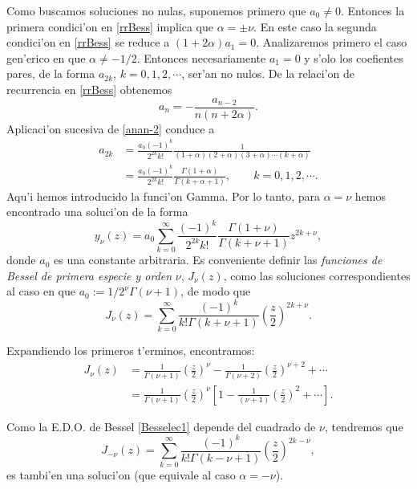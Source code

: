 Como buscamos soluciones no nulas, suponemos primero que $a_0\neq 0$. Entonces la primera condici'on en \eqref{rrBess} implica que $\alpha=\pm\nu$. En este caso la segunda condici'on en \eqref{rrBess} se reduce a $(1+2\alpha)a_1=0$. Analizaremos primero el caso gen'erico en que $\alpha\neq -1/2$. Entonces necesariamente $a_1=0$ y s'olo los coefientes pares, de la forma $a_{2k}$, $k=0,1,2,\cdots$, ser'an no nulos. De la relaci'on de recurrencia en \eqref{rrBess} obtenemos
\begin{equation}\label{anan-2}
a_n=-\frac{a_{n-2}}{n(n+2\alpha)}.
\end{equation}
Aplicaci'on sucesiva de \eqref{anan-2} conduce a
\begin{align}
a_{2 k} &= \frac{a_0(-1)^k}{2^{2k}k!}\frac{1}{(1+\alpha)(2+\alpha)(3+\alpha)\cdots (k+\alpha)}\\
&= \frac{a_0 (-1)^k}{2^{2k} k!}\frac{\Gamma(1+\alpha)}{\Gamma(k +\alpha+ 1) }, \qquad k=0,1,2,\cdots. 
\end{align}
Aqu'i hemos introducido la funci'on Gamma. Por lo tanto, para $\alpha=\nu$ hemos encontrado una soluci'on de la forma
\begin{equation}
y_\nu(z) = a_0 \sum_{k=0}^\infty \frac{(-1)^k}{2^{2k}k!}\frac{\Gamma(1+\nu)}{\Gamma(k+\nu+ 1) }
z^{2k+\nu},
\end{equation}
donde $a_0$ es una constante arbitraria. Es conveniente definir las \textit{funciones de Bessel de primera especie y orden} $\nu$, $J_\nu(z)$, como las soluciones correspondientes al caso en que $a_0:=1/2^{\nu}\Gamma(\nu+1)$, de modo que
\begin{equation}\label{Besselnu}
\boxed{J_\nu(z) = \sum_{k = 0}^\infty \frac{ (-1)^k }{ k! \Gamma(k + \nu + 1) }
\left( \frac{z}{2} \right)^{2k+\nu}.}
\end{equation}

Expandiendo los primeros t'erminos, encontramos:
\begin{align}\label{J-nu}
J_\nu(z) &= \frac{1}{\Gamma(\nu+1)}\left(\frac{z}{2}\right)^{\nu}
-\frac{1}{\Gamma(\nu+2)}\left(\frac{z}{2}\right)^{\nu+2}+ \cdots \\
&= \frac{1}{\Gamma(\nu+1)}\left(\frac{z}{2}\right)^{\nu}\left[1-\frac{1}{(\nu+1)}\left(\frac{z}{2}\right)^2+\cdots \right].
\end{align}



Como la E.D.O. de Bessel \eqref{Besselec1} depende del cuadrado de $\nu$, tendremos que 
\begin{equation}
J_{-\nu}(z) = \sum_{k = 0}^\infty \frac{ (-1)^k }{ k! \Gamma(k-\nu+1) }
\left( \frac{z}{2} \right)^{2k-\nu},
\end{equation}
es tambi'en una soluci'on (que equivale al caso $\alpha=-\nu$). 

